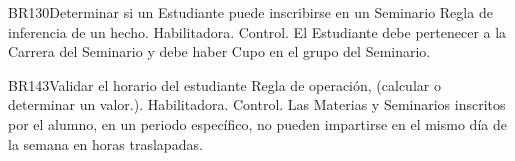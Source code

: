 \begin{BussinesRule}{BR130}{Determinar si un Estudiante puede inscribirse en un Seminario}
	\BRitem[Tipo:] Regla de inferencia de un hecho.
	\BRitem[Clase:] Habilitadora.
	\BRitem[Nivel:] Control. %
	\BRitem[Descripción:] El Estudiante debe pertenecer a la Carrera del Seminario y debe haber Cupo en el grupo del Seminario.


\end{BussinesRule}

\begin{BussinesRule}{BR143}{Validar el horario del estudiante}
	\BRitem[Tipo:] Regla de operación, (calcular o determinar un valor.).
	\BRitem[Clase:] Habilitadora.
	\BRitem[Nivel:] Control. %
	\BRitem[Descripción:] Las Materias y Seminarios inscritos por el alumno, en un periodo específico, no pueden impartirse en el mismo día de la semana en horas traslapadas.


\end{BussinesRule}

